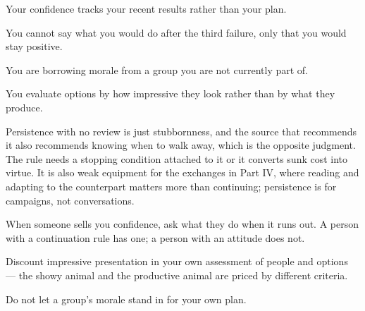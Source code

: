 \begin{feedback}
  \item Your confidence tracks your recent results rather than your plan.
  \item You cannot say what you would do after the third failure, only that you would stay positive.
  \item You are borrowing morale from a group you are not currently part of.
  \item You evaluate options by how impressive they look rather than by what they produce.
\end{feedback}

\begin{failure}
Persistence with no review is just stubbornness, and the source that recommends it also recommends knowing when to walk away, which is the opposite judgment. The rule needs a stopping condition attached to it or it converts sunk cost into virtue. It is also weak equipment for the exchanges in Part IV, where reading and adapting to the counterpart matters more than continuing; persistence is for campaigns, not conversations.
\end{failure}

\begin{countermeasures}
  \item When someone sells you confidence, ask what they do when it runs out. A person with a continuation rule has one; a person with an attitude does not.
  \item Discount impressive presentation in your own assessment of people and options --- the showy animal and the productive animal are priced by different criteria.
  \item Do not let a group's morale stand in for your own plan.
\end{countermeasures}

\seesources
{}

